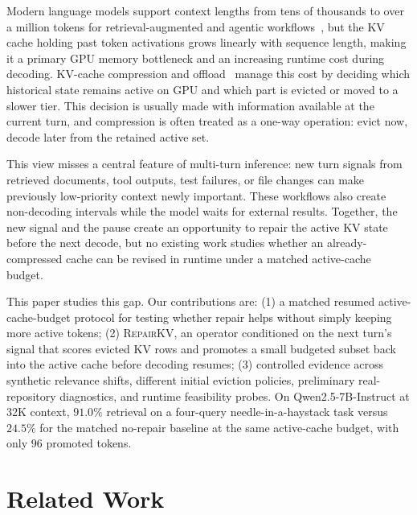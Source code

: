 \documentclass{article}
\newcommand{\repairkv}{\textsc{RepairKV}}
\begin{document}
Modern language models support context lengths from tens of thousands to
over a million tokens for retrieval-augmented and agentic
workflows~\citep{ruler,longbench,inftybench}, but the KV cache holding
past {\color{red}token} activations grows linearly with sequence length, making it a
primary GPU memory bottleneck {\color{red}and an increasing runtime cost during decoding. KV-cache compression and offload~\citep{snapkv,streamingllm,h2o,vllm}  manage this cost by deciding which historical state remains active on GPU and which part is evicted or moved to a slower tier.} This decision is usually made with information available at the current turn, and compression is often treated as a one-way operation: evict now, decode later from the retained active set.

This view misses a central feature of multi-turn inference: {\color{red} new turn signals from } retrieved documents, tool outputs, test failures, or file changes
can make previously low-priority context newly important. {\color{red}These workflows also create} non-decoding intervals while the
model waits for external results. Together, {\color{red}the new signal and the pause create an opportunity to repair} the active KV state before the next decode, but {\color{red}no existing work studies whether an already-compressed cache can be revised in runtime under a matched active-cache budget.}

{\color{red}This paper studies this gap. Our contributions are:} (1) a matched resumed active-cache-budget protocol for testing whether repair helps without simply keeping more active tokens; (2) \repairkv{}, {\color{red}an operator conditioned on the next turn's signal that scores evicted KV rows and promotes a small budgeted subset back into the active cache before decoding resumes}; (3) controlled evidence across synthetic relevance shifts, different initial eviction policies, preliminary real-repository diagnostics, and runtime feasibility probes. On Qwen2.5-7B-Instruct at 32K context, $91.0\%$ retrieval on a four-query needle-in-a-haystack task versus $24.5\%$ for the matched no-repair baseline at the same active-cache budget, with only $96$ promoted tokens.

\section{Related Work}
\label{sec:related}
\end{document}
